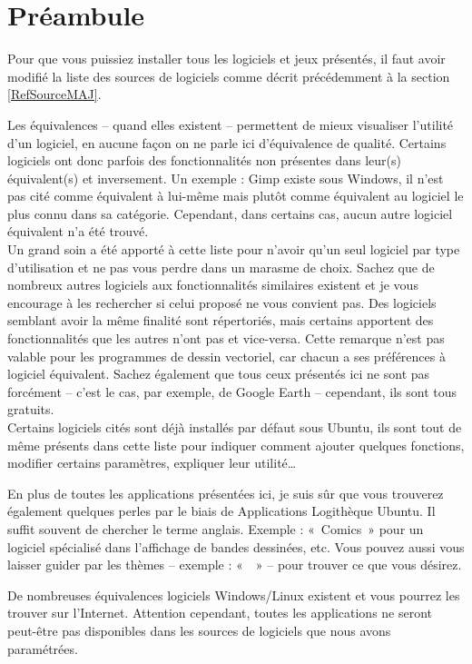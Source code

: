 \section{Préambule}
Pour que vous puissiez installer tous les logiciels et jeux présentés,  il faut avoir modifié la liste des sources de logiciels comme décrit précédemment à la section \ref{RefSourceMAJ}.\par
Les équivalences -- quand elles existent -- permettent de mieux visualiser l'utilité d'un logiciel, en aucune façon on ne parle ici d'équivalence de qualité. Certains logiciels ont donc parfois des fonctionnalités non présentes dans leur(s) équivalent(s) et inversement. Un exemple : Gimp existe sous Windows, il n'est pas cité comme équivalent à lui-même mais plutôt comme équivalent au logiciel le plus connu dans sa catégorie. Cependant, dans certains cas, aucun autre logiciel équivalent n'a été trouvé.\\
Un grand soin a été apporté à cette liste pour n'avoir qu'un seul logiciel par type d'utilisation et ne pas vous perdre dans un marasme de choix. Sachez que de nombreux autres logiciels aux fonctionnalités similaires existent et je vous encourage à les rechercher si celui proposé ne vous convient pas. Des logiciels semblant avoir la même finalité sont répertoriés, mais certains apportent des fonctionnalités que les autres n'ont pas et vice-versa. Cette remarque n'est pas valable pour les programmes de dessin vectoriel, car chacun a ses préférences à logiciel équivalent. Sachez également que tous ceux présentés ici ne sont pas forcément  -- c'est le cas, par exemple, de Google Earth -- cependant, ils sont tous gratuits.\\
Certains logiciels cités sont déjà installés par défaut sous Ubuntu, ils sont tout de même présents dans cette liste pour indiquer comment ajouter quelques fonctions, modifier certains paramètres, expliquer leur utilité\ldots{}\par
En plus de toutes les applications présentées ici, je suis sûr que vous trouverez également quelques perles par le biais de Applications \FlecheDroite Logithèque Ubuntu. Il suffit souvent de chercher le terme anglais. Exemple : «~Comics~» pour un logiciel spécialisé dans l'affichage de bandes dessinées, etc. Vous pouvez aussi vous laisser guider par les thèmes -- exemple : «~~» -- pour trouver ce que vous désirez.\par
\begin{nota}
De nombreuses équivalences logiciels Windows/Linux existent et vous pourrez les trouver sur l'Internet. Attention cependant, toutes les applications ne seront peut-être pas disponibles dans les sources de logiciels que nous avons paramétrées.
\end{nota}
